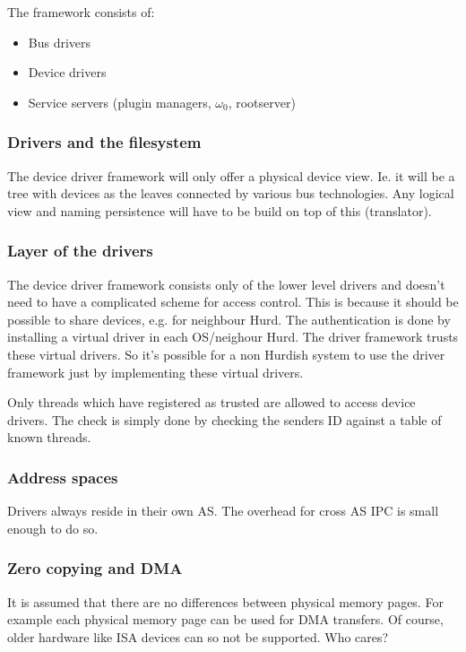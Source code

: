 \documentclass[9pt,a4paper]{extarticle}
\begin{document}
 The framework consists of: 
 \begin{itemize}
 \item Bus drivers
 \item Device drivers
 \item Service servers (plugin managers, $\omega_0$, rootserver)
 \end{itemize}

\subsubsection{Drivers and the filesystem}
  
  The device driver framework will only offer a physical device view.
  Ie. it will be a tree with devices as the leaves connected by
  various bus technologies.  Any logical view and naming persistence
  will have to be build on top of this (translator).

\subsubsection{Layer of the drivers}

  The device driver framework consists only of the lower level drivers
  and doesn't need to have a complicated scheme for access control.
  This is because it should be possible to share devices, e.g. for
  neighbour Hurd.  The authentication is done by installing a virtual
  driver in each OS/neighour Hurd.  The driver framework trusts these
  virtual drivers.  So it's possible for a non Hurdish system to use
  the driver framework just by implementing these virtual drivers.
  
  Only threads which have registered as trusted are allowed to access
  device drivers.  The check is simply done by checking the senders
  ID against a table of known threads.

\subsubsection{Address spaces}

  Drivers always reside in their own AS. The overhead for cross AS IPC
  is small enough to do so.

\subsubsection{Zero copying and DMA}
  
  It is assumed that there are no differences between physical memory
  pages. For example each physical memory page can be used for DMA
  transfers. Of course, older hardware like ISA devices can so not be
  supported. Who cares?
  
\end{document}
